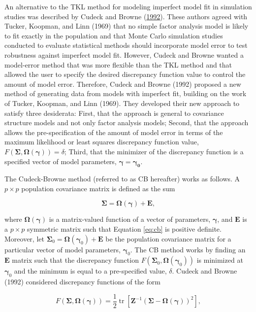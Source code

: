 \documentclass[11pt]{umnthesis}
\DeclareMathOperator{\tr}{tr}
\begin{document}
An alternative to the TKL method for modeling imperfect model fit in simulation studies was described by Cudeck and Browne (\protect\hyperlink{ref-cudeck1992}{1992}). These authors agreed with Tucker, Koopman, and Linn (1969) that no simple factor analysis model is likely to fit exactly in the population and that Monte Carlo simulation studies conducted to evaluate statistical methods should incorporate model error to test robustness against imperfect model fit. However, Cudeck and Browne wanted a model-error method that was more flexible than the TKL method and that allowed the user to specify the desired discrepancy function value to control the amount of model error. Therefore, Cudeck and Browne (1992) proposed a new method of generating data from models with imperfect fit, building on the work of Tucker, Koopman, and Linn (1969). They developed their new approach to satisfy three desiderata: First, that the approach is general to covariance structure models and not only factor analysis models; Second, that the approach allows the pre-specification of the amount of model error in terms of the maximum likelihood or least squares discrepancy function value, \(F(\bm{\Sigma}, \bm{\Omega}(\bm{\gamma})) = \delta\); Third, that the minimizer of the discrepancy function is a specified vector of model parameters, \(\bm{\gamma} = \bm{\gamma_0}\).

The Cudeck-Browne method (referred to as CB hereafter) works as follows. A \(p \times p\) population covariance matrix is defined as the sum

\begin{equation}
\bm{\Sigma} = \bm{\Omega}(\bm{\gamma}) + \mathbf{E},
\label{eq:cb}
\end{equation}

\noindent where \(\bm{\Omega}(\bm{\gamma})\) is a matrix-valued function of a vector of parameters, \(\bm{\gamma}\), and \(\mathbf{E}\) is a \(p \times p\) symmetric matrix such that Equation \eqref{eq:cb} is positive definite. Moreover, let \(\bm{\Sigma}_0 = \bm{\Omega}(\bm{\gamma}_0) + \mathbf{E}\) be the population covariance matrix for a particular vector of model parameters, \(\bm{\gamma}_0\). The CB method works by finding an \(\mathbf{E}\) matrix such that the discrepancy function \(F(\bm{\Sigma}_0, \bm{\Omega}(\bm{\gamma}_0))\) is minimized at \(\bm{\gamma}_0\) and the minimum is equal to a pre-specified value, \(\delta\). Cudeck and Browne (1992) considered discrepancy functions of the form

\begin{equation}
F(\bm{\Sigma}, \bm{\Omega}(\bm{\gamma})) = \frac{1}{2} \tr [\mathbf{Z}^{-1}(\bm{\Sigma} - \bm{\Omega}(\bm{\gamma}))^2],
\label{eq:disc-fun}
\end{equation}
\end{document}
